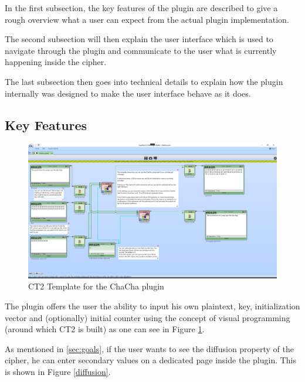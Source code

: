 In the first subsection, the key features of the plugin are described to give a rough overview what a user can expect from the actual plugin implementation.

\par

The second subsection will then explain the user interface which is used to navigate through the plugin and communicate to the user what is currently happening inside the cipher.

\par

The last subsection then goes into technical details to explain how the plugin internally was designed to make the user interface behave as it does.


\subsection{Key Features}
\label{sec:keyFeatures}

\begin{figure}
\caption{CT2 Template for the ChaCha plugin}
\label{plugin.template}
\includegraphics[width=\textwidth]{figures/plugin-template.png}
\end{figure}

The plugin offers the user the ability to input his own plaintext, key, initialization vector and (optionally) initial counter using the concept of visual programming (around which CT2 is built) as one can see in Figure \ref{plugin.template}. 

\par

As mentioned in \ref{sec:goals}, if the user wants to see the diffusion property of the cipher, he can enter secondary values on a dedicated page inside the plugin. This is shown in Figure \ref{diffusion}.


